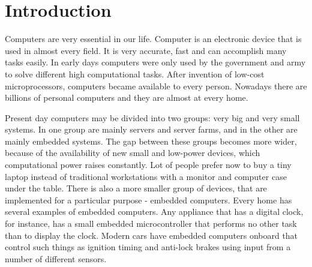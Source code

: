 \newpage
\section{Introduction}




% 


% 
% 
% 
% 
% 
% 





Computers are very essential in our life. Computer is an electronic device that
is used in almost every field. It is very accurate, fast and can accomplish
many tasks easily. In early days computers were only used by the government
and army to solve different high computational tasks. After invention of
low-cost microprocessors, computers became available to every person. Nowadays  
there are billions of personal computers and they are almost at every home.

Present day computers may be divided into two groups: very big and very small systems. In one group are mainly servers and
server farms, and in the other are mainly embedded systems. 
The gap between these groups becomes more wider, because of the availability of new small and low-power devices, which computational power raises constantly.
Lot of people prefer now to buy a tiny laptop instead of traditional workstations with a monitor and computer case under the table.
There is also a more smaller group of devices, that are implemented for a particular purpose - embedded computers.  
Every home has several examples of embedded computers.
Any appliance that has a digital clock, for instance, has a small embedded microcontroller that performs no other task than to display the clock.
Modern cars have embedded computers onboard that control such things as ignition timing and anti-lock brakes using input from a number of different sensors.


